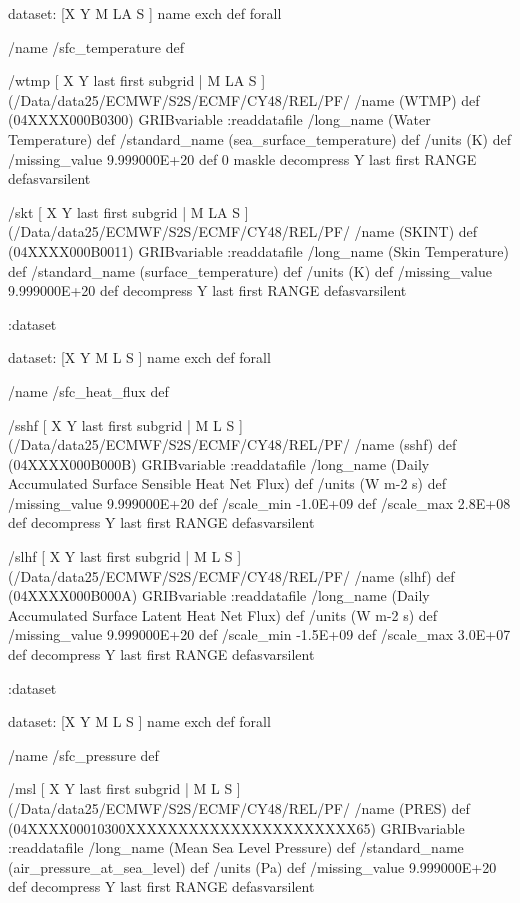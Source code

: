 \begin{ingrid}
dataset:
[X Y M LA S ] {name exch def } forall

/name /sfc_temperature def


/wtmp { [ X Y last first subgrid | M LA S ] (/Data/data25/ECMWF/S2S/ECMF/CY48/REL/PF/%
/name (WTMP) def
(04XXXX000B0300) GRIBvariable
:readdatafile
/long_name (Water Temperature) def
/standard_name (sea_surface_temperature) def
/units (K) def
/missing_value 9.999000E+20 def
0 maskle
decompress
Y last first RANGE
} defasvarsilent


/skt { [ X Y last first subgrid | M LA S ] (/Data/data25/ECMWF/S2S/ECMF/CY48/REL/PF/%
/name (SKINT) def
(04XXXX000B0011) GRIBvariable
:readdatafile
/long_name (Skin Temperature) def
/standard_name (surface_temperature) def
/units (K) def
/missing_value 9.999000E+20 def
decompress
Y last first RANGE
} defasvarsilent

:dataset


dataset:
[X Y M L S ] {name exch def } forall

/name /sfc_heat_flux def

/sshf { [ X Y last first subgrid | M L S ] (/Data/data25/ECMWF/S2S/ECMF/CY48/REL/PF/%
/name (sshf) def
(04XXXX000B000B) GRIBvariable
:readdatafile
/long_name (Daily Accumulated Surface Sensible Heat Net Flux) def
/units (W m-2 s) def
/missing_value 9.999000E+20 def
/scale_min -1.0E+09 def
/scale_max 2.8E+08 def
decompress
Y last first RANGE
} defasvarsilent

/slhf { [ X Y last first subgrid | M L S ] (/Data/data25/ECMWF/S2S/ECMF/CY48/REL/PF/%
/name (slhf) def
(04XXXX000B000A) GRIBvariable
:readdatafile
/long_name (Daily Accumulated Surface Latent Heat Net Flux) def
/units (W m-2 s) def
/missing_value 9.999000E+20 def
/scale_min -1.5E+09 def
/scale_max 3.0E+07 def
decompress
Y last first RANGE
} defasvarsilent

:dataset

dataset:
[X Y M L S ] {name exch def } forall

/name /sfc_pressure def

/msl { [ X Y last first subgrid | M L S ] (/Data/data25/ECMWF/S2S/ECMF/CY48/REL/PF/%
/name (PRES) def
(04XXXX00010300XXXXXXXXXXXXXXXXXXXXXX65) GRIBvariable
:readdatafile
/long_name (Mean Sea Level Pressure) def
/standard_name (air_pressure_at_sea_level) def
/units (Pa) def
/missing_value 9.999000E+20 def
decompress
Y last first RANGE
} defasvarsilent


\end{ingrid}
